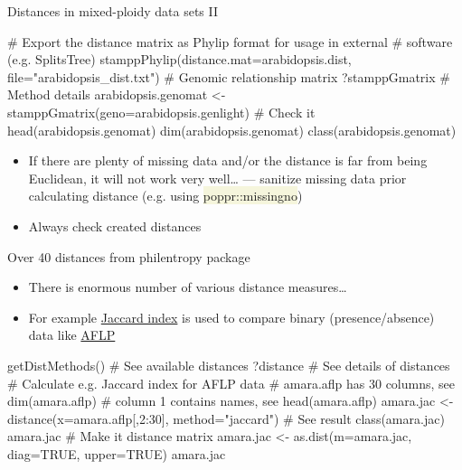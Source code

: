 \documentclass[compress, xelatex, 11pt, xcolor=svgnames, aspectratio=169, url={hyphens, lowtilde}]{beamer}
\renewcommand{\texttt}[1]{\colorbox{Beige}{{\ttfamily #1}}}
\begin{document}
\begin{frame}[fragile]{Distances in mixed-ploidy data sets II}
	\begin{spluscode}
    # Export the distance matrix as Phylip format for usage in external
    # software (e.g. SplitsTree)
    stamppPhylip(distance.mat=arabidopsis.dist, file="arabidopsis_dist.txt")
    # Genomic relationship matrix
    ?stamppGmatrix # Method details
    arabidopsis.genomat <- stamppGmatrix(geno=arabidopsis.genlight)
    # Check it
    head(arabidopsis.genomat)
    dim(arabidopsis.genomat)
    class(arabidopsis.genomat)
	\end{spluscode}
	\begin{itemize}
		\item If there are plenty of missing data and/or the distance is far from being Euclidean, it will not work very well\ldots{ } --- sanitize missing data prior calculating distance (e.g. using \texttt{poppr::missingno})
		\item Always check created distances
	\end{itemize}
\end{frame}

\begin{frame}[fragile]{Over 40 distances from philentropy package}
	\begin{itemize}
		\item There is enormous number of various distance measures\ldots
		\item For example \href{https://en.wikipedia.org/wiki/Jaccard_index}{Jaccard index} is used to compare binary (presence/absence) data like \href{https://en.wikipedia.org/wiki/Amplified_fragment_length_polymorphism}{AFLP}
	\end{itemize}
	\begin{spluscode}
    getDistMethods() # See available distances
    ?distance # See details of distances
    # Calculate e.g. Jaccard index for AFLP data
    # amara.aflp has 30 columns, see dim(amara.aflp)
    # column 1 contains names, see head(amara.aflp)
    amara.jac <- distance(x=amara.aflp[,2:30], method="jaccard")
    # See result
    class(amara.jac)
    amara.jac
    # Make it distance matrix
    amara.jac <- as.dist(m=amara.jac, diag=TRUE, upper=TRUE)
    amara.jac
	\end{spluscode}
\end{frame}
\end{document}
